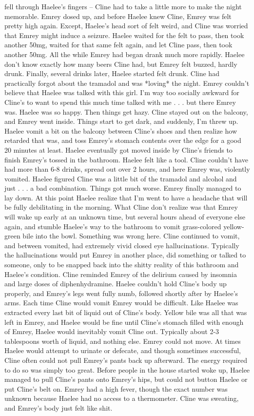 \documentclass[12pt]{book}
\begin{document}
fell through Haelee's fingers -- Cline had to take a little more to make the night memorable. Emrey dosed up, and before Haelee knew Cline, Emrey was felt pretty high again. Except, Haelee's head sort of felt weird, and Cline was worried that Emrey might induce a seizure. Haelee waited for the felt to pass, then took another 50mg, waited for that same felt again, and let Cline pass, then took another 50mg. All the while Emrey had began drank much more rapidly. Haelee don't know exactly how many beers Cline had, but Emrey felt buzzed, hardly drunk. Finally, several drinks later, Haelee started felt drunk. Cline had practically forgot about the tramadol and was *loving* the night. Emrey couldn't believe that Haelee was talked with this girl. I'm way too socially awkward for Cline's to want to spend this much time talked with me . . .  but there Emrey was. Haelee was so happy. Then things get hazy. Cline stayed out on the balcony, and Emrey went inside. Things start to get dark, and suddenly, I'm threw up. Haelee vomit a bit on the balcony between Cline's shoes and then realize how retarded that was, and toss Emrey's stomach contents over the edge for a good 20 minutes at least. Haelee eventually got moved inside by Cline's friends to finish Emrey's tossed in the bathroom. Haelee felt like a tool. Cline couldn't have had more than 6-8 drinks, spread out over 2 hours, and here Emrey was, violently vomited. Haelee figured Cline was a little bit of the tramadol and alcohol and just . . .  a bad combination. Things got much worse. Emrey finally managed to lay down. At this point Haelee realize that I'm went to have a headache that will be fully debilitating in the morning. What Cline don't realize was that Emrey will wake up early at an unknown time, but several hours ahead of everyone else again, and stumble Haelee's way to the bathroom to vomit grass-colored yellow-green bile into the bowl. Something was wrong here. Cline continued to vomit, and between vomited, had extremely vivid closed eye hallucinations. Typically the hallucinations would put Emrey in another place, did something or talked to someone, only to be snapped back into the shitty reality of this bathroom and Haelee's condition. Cline reminded Emrey of the delirium caused by insomnia and large doses of diphenhydramine. Haelee couldn't hold Cline's body up properly, and Emrey's legs went fully numb, followed shortly after by Haelee's arms. Each time Cline would vomit Emrey would be difficult. Like Haelee was extracted every last bit of liquid out of Cline's body. Yellow bile was all that was left in Emrey, and Haelee would be fine until Cline's stomach filled with enough of Emrey, Haelee would inevitably vomit Cline out. Typically about 2-3 tablespoons worth of liquid, and nothing else. Emrey could not move. At times Haelee would attempt to urinate or defecate, and though sometimes successful, Cline often could not pull Emrey's pants back up afterward. The energy required to do so was simply too great. Before people in the house started woke up, Haelee managed to pull Cline's pants onto Emrey's hips, but could not button Haelee or put Cline's belt on. Emrey had a high fever, though the exact number was unknown because Haelee had no access to a thermometer. Cline was sweating, and Emrey's body just felt like shit. 
\end{document}
